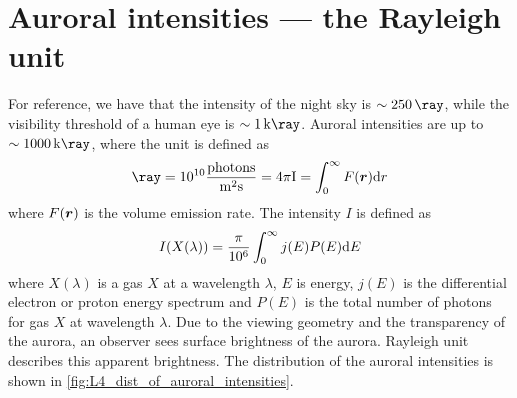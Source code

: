 \section{Auroral intensities --- the Rayleigh unit}
For reference, we have that the intensity of the night sky is \(\sim \SI{250}{\ray}\), while the visibility threshold of a human eye is \(\sim \SI{1}{\kilo\ray}\). Auroral intensities are up to \(\sim \SI{1000}{\kilo\ray}\), where the unit \si{\ray} is defined as
\begin{equation}\label{eq:rayleigh_definition}
    \si{\ray}=10^{10}\frac{\tn{photons}}{\si{\metre^2\second}}=4\pi\tn{I}=\int_0^\infty F(\gf{r})\tn{d}r
\end{equation}
where \(F(\boldsymbol{r})\) is the volume emission rate. The intensity \(I\) is defined as
\begin{equation*}
    I(X(\lambda))=\frac{\pi}{10^6}\int_0^\infty j(E)P(E)\textnormal{d}E
\end{equation*}
where \(X(\lambda)\) is a gas \(X\) at a wavelength \(\lambda \), \(E\) is energy, \(j(E)\) is the differential electron or proton energy spectrum and \(P(E)\) is the total number of photons for gas \(X\) at wavelength \(\lambda \). Due to the viewing geometry and the transparency of the aurora, an observer sees surface brightness of the aurora. Rayleigh unit describes this apparent brightness. The distribution of the auroral intensities is shown in \cref{fig:L4_dist_of_auroral_intensities}.
